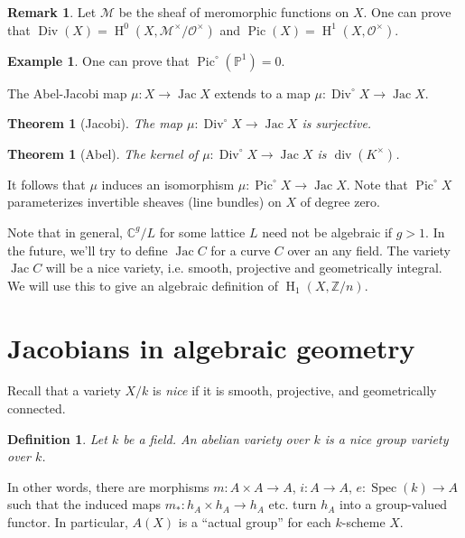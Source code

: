 \documentclass{article}
\DeclareMathOperator{\Div}{Div}
\DeclareMathOperator{\h}{H}
\DeclareMathOperator{\jac}{Jac}
\DeclareMathOperator{\pic}{Pic}
\DeclareMathOperator{\spec}{Spec}
\newcommand{\sO}{\mathscr{O}}
\newtheorem{theorem}[subsection]{Theorem}
\newtheorem{definition}[subsection]{Definition}
\theoremstyle{definition}
\newtheorem{example}[subsection]{Example}
\newtheorem{remark}[subsection]{Remark}
\begin{document}
\begin{remark}
Let $\mathscr{M}$ be the sheaf of meromorphic functions on $X$. One can 
prove that $\Div(X)=\h^0(X,\mathscr{M}^\times/\sO^\times)$ and 
$\pic(X)=\h^1(X,\sO^\times)$. 
\end{remark}

\begin{example}
One can prove that $\pic^\circ(\mathbb{P}^1) = 0$.
\end{example}

The Abel-Jacobi map $\mu:X\to \jac X$ extends to a map 
$\mu:\Div^\circ X\to \jac X$. 

\begin{theorem}[Jacobi]
The map $\mu:\Div^\circ X\to\jac X$ is surjective.
\end{theorem}

\begin{theorem}[Abel]
The kernel of $\mu:\Div^\circ X\to \jac X$ is $\operatorname{div}(K^\times)$. 
\end{theorem}

It follows that $\mu$ induces an isomorphism $\mu:\pic^\circ X\to \jac X$. 
Note that $\pic^\circ X$ parameterizes invertible sheaves (line bundles) on 
$X$ of degree zero. 

Note that in general, $\mathbb{C}^g/L$ for some lattice $L$ need not be 
algebraic if $g>1$. In the future, we'll try to define $\jac C$ for a curve 
$C$ over an any field. The variety $\jac C$ will be a nice variety, i.e. 
smooth, projective and geometrically integral. We will use this to give an 
algebraic definition of $\h_1(X,\mathbb{Z}/n)$. 





\section{Jacobians in algebraic geometry}

Recall that a variety $X/k$ is \emph{nice} if it is smooth, projective, and 
geometrically connected. 

\begin{definition}
Let $k$ be a field. An \emph{abelian variety} over $k$ is a nice group variety 
over $k$.
\end{definition}

In other words, there are morphisms $m:A\times A\to A$, $i:A\to A$, 
$e:\spec(k)\to A$ such that the induced maps $m_*:h_A\times h_A\to h_A$ etc. 
turn $h_A$ into a group-valued functor. In particular, $A(X)$ is a ``actual 
group'' for each $k$-scheme $X$. 
\end{document}
